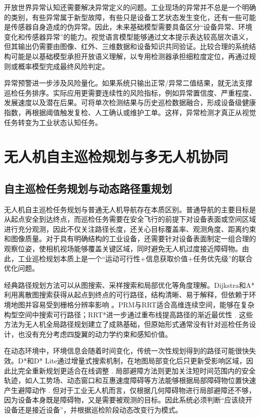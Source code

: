 开放世界异常认知还需要解决异常定义的问题。工业现场的异常并不总是一个明确的类别，有些异常属于新型故障，有些只是设备工艺状态发生变化，还有一些可能是传感器自身造成的伪异常。因此，未来基础模型需要具备区分“设备异常、环境变化和传感器异常”的能力。视觉语言模型能够通过文本提示表达较高层次语义，但其输出仍需要由图像、红外、三维数据和设备知识共同验证。比较合理的系统结构可能是以基础模型承担开放语义理解，以专用检测器承担细粒度定位，再通过规则或概率模型完成最终风险判定。

异常预警进一步涉及风险量化。如果系统只输出正常/异常二值结果，就无法支撑巡检任务排序。实际应用更需要连续性的风险指标，例如异常置信度、严重程度、发展速度以及潜在后果。可将单次检测结果与历史巡检数据融合，形成设备级健康指数，再根据阈值触发复检、人工确认或维护工单。这样，异常检测才真正从视觉任务转变为工业状态认知任务。

\section{无人机自主巡检规划与多无人机协同}

\subsection{自主巡检任务规划与动态路径重规划}

无人机自主巡检任务规划与普通无人机导航存在本质区别。普通导航的主要目标是从起点安全到达终点，而巡检任务需要在安全飞行的前提下对设备表面或空间区域进行充分观测，因此不仅关注路径长度，还关心目标覆盖率、观测角度、距离约束和图像质量。对于具有明确结构的工业设备，还需要针对设备表面制定一组合理的观察位姿，使相机视场能够覆盖关键区域，同时避免无人机过度接近障碍物。由此，工业巡检规划本质上是一个“运动可行性+信息获取价值+任务优先级”的联合优化问题。

经典路径规划方法可以从图搜索、采样搜索和局部优化等角度理解。Dijkstra和A*利用离散图搜索获得从起点到终点的可行路径，结构清晰、易于解释，但依赖于环境地图并容易受到栅格分辨率影响
\cite{dijkstra1959note,hart1968formal}。PRM与RRT适合高维连续空间，能够在复杂构型空间中搜索可行路径；RRT*进一步通过重布线提高路径的渐近最优性
\cite{kavraki1996probabilistic,lavalle2001randomized,karaman2011sampling}. 这些方法为无人机全局路径规划建立了成熟基础，但原始形式通常没有针对巡检任务设计，也没有充分考虑四旋翼的动力学约束和感知价值。

在动态环境中，环境信息会随着时间变化，传统一次性规划得到的路径可能很快失效。D*和D* Lite通过增量式搜索机制，在地图局部变化后只更新受影响区域，因此比完全重新规划更适合在线调整
\cite{stentz1994optimal,koenig2002d}. 局部避障方法则更加关注短时间范围内的安全轨迹，如人工势场、动态窗口和互惠速度障碍等方法能够根据局部障碍物位置快速产生避障动作
\cite{khatib1986real,fox1997dynamic,van2011reciprocal}. 但对于工业无人机而言，仅根据几何障碍物进行局部避障还不够，因为设备本身既是障碍物，又是需要被观测的目标。因此系统必须判断“应该绕开设备还是接近设备”，并根据巡检阶段动态改变行为模式。

